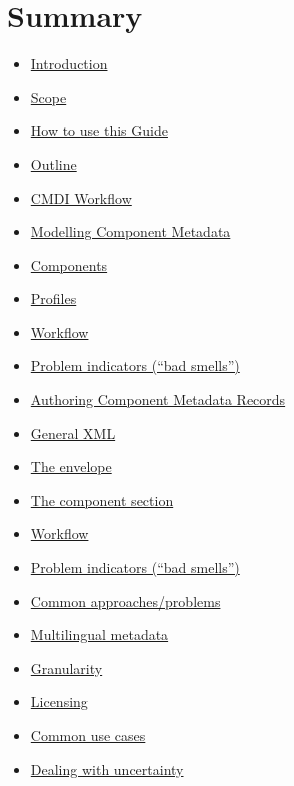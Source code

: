 \documentclass[]{article}
\date{}
\providecommand{\tightlist}{%
  \setlength{\itemsep}{0pt}\setlength{\parskip}{0pt}}
\begin{document}
\section{Summary}\label{summary}

\begin{itemize}
\tightlist
\item
  \href{README.md}{Introduction}
\item
  \href{introduction/scope.md}{Scope}
\item
  \href{how-to-use-this-guide.md}{How to use this Guide}
\item
  \href{introduction/outline.md}{Outline}
\item
  \href{cmdi_workflow.md}{CMDI Workflow}
\item
  \href{modelling_component_metadata/README.md}{Modelling Component
  Metadata}
\item
  \href{modelling_component_metadata/components.md}{Components}
\item
  \href{modelling_component_metadata/profiles.md}{Profiles}
\item
  \href{modelling_component_metadata/workflow.md}{Workflow}
\item
  \href{modelling_component_metadata/problem_indicators_bad_smells.md}{Problem
  indicators (``bad smells'')}
\item
  \href{authoring_component_metadata_records/README.md}{Authoring
  Component Metadata Records}
\item
  \href{authoring_component_metadata_records/general_xml.md}{General
  XML}
\item
  \href{authoring_component_metadata_records/the_envelope.md}{The
  envelope}
\item
  \href{authoring_component_metadata_records/the_component_section.md}{The
  component section}
\item
  \href{authoring_component_metadata_records/workflow.md}{Workflow}
\item
  \href{authoring_component_metadata_records/problem_indicators_bad_smells.md}{Problem
  indicators (``bad smells'')}
\item
  \href{common_approachesproblems/README.md}{Common approaches/problems}
\item
  \href{common_approachesproblems/multilingual_metadata.md}{Multilingual
  metadata}
\item
  \href{common_approachesproblems/granularity.md}{Granularity}
\item
  \href{common_approachesproblems/licensing.md}{Licensing}
\item
  \href{common_approachesproblems/common_use_cases.md}{Common use cases}
\item
  \href{common_approachesproblems/dealing-with-uncertainty.md}{Dealing
  with uncertainty}
\end{itemize}
\end{document}
